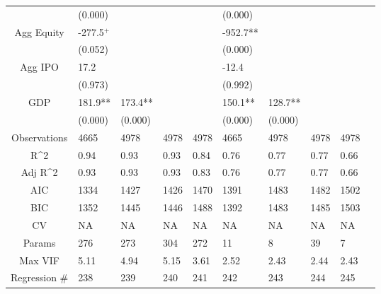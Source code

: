 \documentclass{article}
\begin{document}
\begin{table}[H]
\begin{tabular}{|clllllllll|}
   & (0.000) &  &  &  & (0.000) &  &  &  & \\
  Agg Equity & -277.5$^{+}$ &  &  &  & -952.7** &  &  &  & \\
   & (0.052) &  &  &  & (0.000) &  &  &  & \\
  Agg IPO & 17.2 &  &  &  & -12.4 &  &  &  & \\
   & (0.973) &  &  &  & (0.992) &  &  &  & \\
  GDP & 181.9** & 173.4** &  &  & 150.1** & 128.7** &  &  & \\
   & (0.000) & (0.000) &  &  & (0.000) & (0.000) &  &  & \\
  \hline
 Observations & 4665 & 4978 & 4978 & 4978 & 4665 & 4978 & 4978 & 4978 & \\
  R^2 & 0.94 & 0.93 & 0.93 & 0.84 & 0.76 & 0.77 & 0.77 & 0.66 & \\
  Adj R^2 & 0.93 & 0.93 & 0.93 & 0.83 & 0.76 & 0.77 & 0.77 & 0.66 & \\
  AIC & 1334 & 1427 & 1426 & 1470 & 1391 & 1483 & 1482 & 1502 & \\
  BIC & 1352 & 1445 & 1446 & 1488 & 1392 & 1483 & 1485 & 1503 & \\
  CV & NA & NA & NA & NA & NA & NA & NA & NA & \\
  Params & 276 & 273 & 304 & 272 & 11 & 8 & 39 & 7 & \\
  Max VIF & 5.11 & 4.94 & 5.15 & 3.61 & 2.52 & 2.43 & 2.44 & 2.43 & \\
  Regression \# & 238 & 239 & 240 & 241 & 242 & 243 & 244 & 245 & \\
   \hline
\end{tabular}

\end{table}
\end{document}
